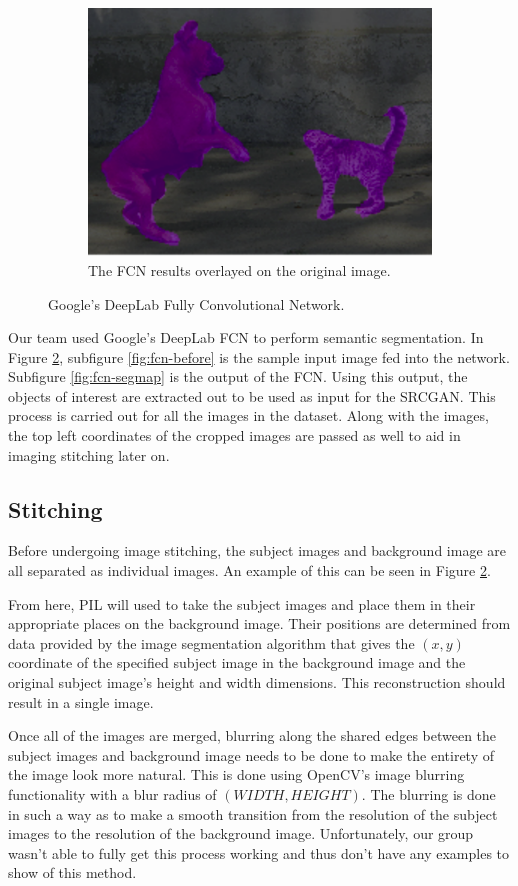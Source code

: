 \begin{figure}
	\begin{subfigure}[h]{0.4\textwidth}
		\centering
		\includegraphics[width=\textwidth]{images/fcn-overlay.png}
		\caption{The FCN results overlayed on the original image.}
		\label{fig:fcn-overlay}
	\end{subfigure}

	\caption{Google's DeepLab Fully Convolutional Network.}
	\label{fig:fcn}
\end{figure}

Our team used Google’s DeepLab FCN to perform semantic segmentation.
In Figure \ref{fig:fcn}, subfigure \ref{fig:fcn-before} is the sample input image
fed into the network. Subfigure \ref{fig:fcn-segmap} is the output of the FCN. 
Using this output, the objects of
interest are extracted out to be used as input for the SRCGAN. This process is
carried out for all the images in the dataset. Along with the images, the top
left coordinates of the cropped images are passed as well to aid in imaging
stitching later on.

\subsection{Stitching}
Before undergoing image stitching, the subject images and background image are
all separated as individual images. An example of this can be seen in Figure
\ref{fig:fcn}.

From here, PIL will used to take the subject images and place them in their
appropriate places on the background image. Their positions are determined from
data provided by the image segmentation algorithm that gives the $(x,y)$
coordinate of the specified subject image in the background image and the
original subject image’s height and width dimensions. This reconstruction
should result in a single image.

Once all of the images are merged, blurring along the shared
edges between the subject images and background image needs to be done to make
the entirety of the image look more natural. This is done using OpenCV’s image
blurring functionality with a blur radius of $(WIDTH, HEIGHT)$. The blurring is
done in such a way as to make a smooth transition from the resolution of the
subject images to the resolution of the background image. Unfortunately, our
group wasn't able to fully get this process working and thus don't have any
examples to show of this method.
